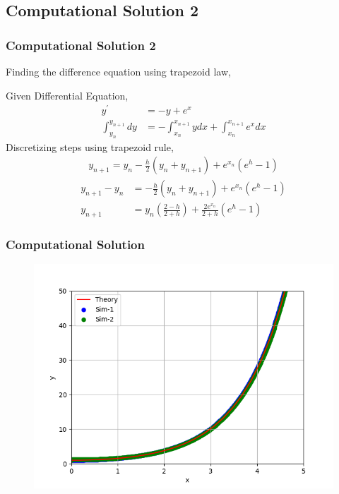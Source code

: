 \documentclass{beamer}
\providecommand{\brak}[1]{\ensuremath{\left(#1\right)}}
\theoremstyle{remark}
\numberwithin{equation}{section}
\begin{document}
    \subsection{Computational Solution 2}
		\begin{frame}[fragile]
			\frametitle{Computational Solution 2}
Finding the difference equation using trapezoid law,

Given Differential Equation,
      {\small
\begin{align}
  y^{\prime} &= -y + e^x \\
  \int_{y_n}^{y_{n+1}} dy &= -\int_{x_n}^{x_{n+1}} ydx +\int_{x_n}^{x_{n+1}} e^x dx  
\end{align}
      }
Discretizing steps using trapezoid rule, 
      {\small
\begin{align}
  y_{n+1} = y_n - \frac{h}{2}\brak{y_n + y_{n+1}} + e^{x_n}(e^h-1)
\end{align}
\begin{align}
  y_{n+1} - y_n &= -\frac{h}{2}\brak{y_n + y_{n+1}} + e^{x_n}\brak{e^h-1}\\
  y_{n+1} &= y_n\brak{\frac{2-h}{2+h}} + \frac{2e^{x_n}}{2+h}\brak{e^h-1}
\end{align}	
      }
    \end{frame}
		\begin{frame}[fragile]
			\frametitle{Computational Solution}
			\begin{figure}[h!]
				\centering
				\includegraphics[width=1\columnwidth]{figs/fig.png}
				\label{stemplot}
			\end{figure}
	\end{frame}
	
\end{document}
